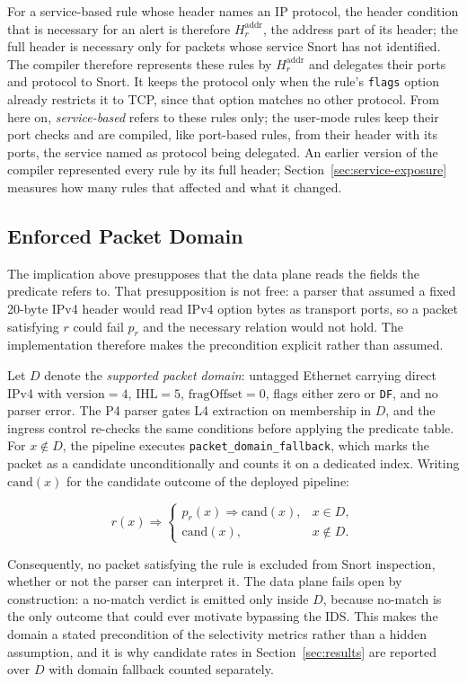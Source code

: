 \documentclass{article}
\begin{document}
For a service-based rule whose header names an IP protocol, the header
condition that is necessary for an alert is therefore
$H_r^{\mathrm{addr}}$, the address part of its header; the full header is
necessary only for packets whose service Snort has not identified. The
compiler therefore represents these rules by $H_r^{\mathrm{addr}}$ and
delegates their ports and protocol to Snort. It keeps the protocol only when
the rule's \texttt{flags} option already restricts it to TCP, since that
option matches no other protocol. From here on, \emph{service-based} refers
to these rules only; the user-mode rules keep their port checks and are
compiled, like port-based rules, from their header with its ports, the
service named as protocol being delegated. An earlier version of the
compiler represented every rule by its full header;
Section~\ref{sec:service-exposure} measures how many rules that affected and
what it changed.

\subsection{Enforced Packet Domain}
\label{sec:packet-domain}
The implication above presupposes that the data plane reads the fields the
predicate refers to. That presupposition is not free: a parser that assumed a
fixed 20-byte IPv4 header would read IPv4 option bytes as transport ports, so
a packet satisfying $r$ could fail $p_r$ and the necessary relation would not
hold. The implementation therefore makes the precondition explicit rather
than assumed.

Let $D$ denote the \emph{supported packet domain}: untagged Ethernet carrying
direct IPv4 with $\mathrm{version}=4$, $\mathrm{IHL}=5$,
$\mathrm{fragOffset}=0$, flags either zero or \texttt{DF}, and no parser
error. The P4 parser gates L4 extraction on membership in $D$, and the
ingress control re-checks the same conditions before applying the predicate
table. For $x \notin D$, the pipeline executes
\texttt{packet\_domain\_fallback}, which marks the packet as a candidate
unconditionally and counts it on a dedicated index. Writing
$\mathrm{cand}(x)$ for the candidate outcome of the deployed pipeline:

\[
r(x) \Rightarrow
\begin{cases}
p_r(x) \Rightarrow \mathrm{cand}(x), & x \in D,\\
\mathrm{cand}(x), & x \notin D.
\end{cases}
\]

Consequently, no packet satisfying the rule is excluded from Snort
inspection, whether or not the parser can interpret it. The data plane fails
open by construction: a no-match verdict is emitted only inside $D$, because
no-match is the only outcome that could ever motivate bypassing the IDS.
This makes the domain a stated precondition of the selectivity metrics rather
than a hidden assumption, and it is why candidate rates in
Section~\ref{sec:results} are reported over $D$ with domain fallback counted
separately.
\end{document}
